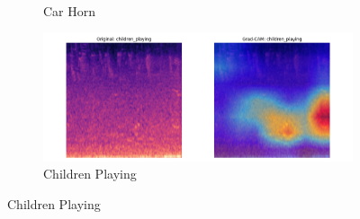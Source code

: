 \documentclass[11pt]{article}
\begin{document}
\begin{figure}[ht]
\begin{subfigure}[b]{0.24\textwidth}
        \caption{Car Horn}
    \end{subfigure}
    \hfill
    \begin{subfigure}[b]{0.24\textwidth}
        \centering
        \includegraphics[width=\textwidth]{latex/assets/efficientnet_fold7_gradcam/gradcam_children_playing_0.png}
        \caption{Children Playing}
    \end{subfigure}
    
    \vspace{0.5cm}
    

\end{figure}
\end{document}
